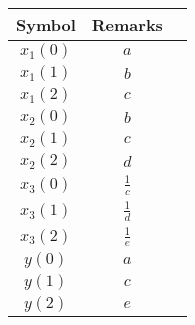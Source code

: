 \begin{tabular}{|c|c|c|}
    \hline
     \textbf{Symbol} & \textbf{Remarks} \\
    \hline
     $x_1(0)$ &  $a$\\[6pt]
    \hline
     $x_1(1)$ &  $b$\\[6pt]
    \hline
     $x_1(2)$ &  $c$\\[6pt]
    \hline
     $x_2(0)$ &  $b$\\[6pt]
    \hline
     $x_2(1)$ &  $c$\\[6pt]
    \hline
     $x_2(2)$ &  $d$\\[6pt]
    \hline
     $x_3(0)$ &  $\frac{1}{c}$\\[6pt]
    \hline
     $x_3(1)$ &  $\frac{1}{d}$\\[6pt]
    \hline
     $x_3(2)$ &  $\frac{1}{e}$\\[6pt]
    \hline
     $y(0)$   &  $a$\\[6pt]
    \hline
     $y(1)$   &  $c$\\[6pt]
    \hline
     $y(2)$   &  $e$\\[6pt]
    \hline
\end{tabular}

